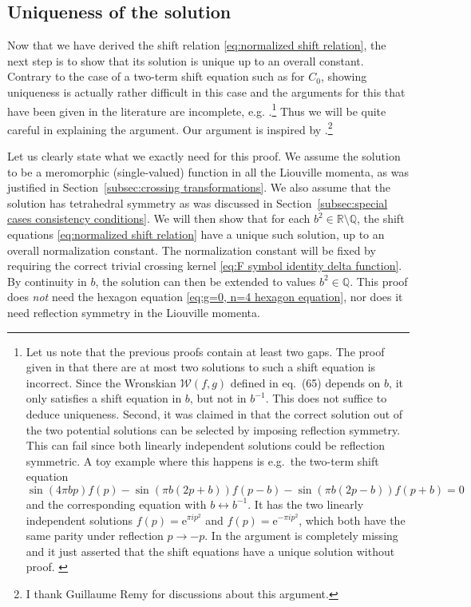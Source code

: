 \documentclass[12pt,a4paper]{article}
\newcommand{\be}{\begin{equation}}
\newcommand{\ee}{\end{equation}}
\newcommand\RR{\mathbb{R}}
\newcommand\QQ{\mathbb{Q}}
\begin{document}
\subsection{Uniqueness of the solution} \label{subsec:uniqueness}
Now that we have derived the shift relation \eqref{eq:normalized shift relation}, the next step is to show that its solution is unique up to an overall constant. Contrary to the case of a two-term shift equation such as for $C_0$, showing uniqueness is actually rather difficult in this case and the arguments for this that have been given in the literature are incomplete, e.g. \cite{Ponsot:1999uf, Ponsot:2001ng,  Teschner:2003en, Remy:2020suk, Roussillon:2020lyc}.\footnote{Let us note that the previous proofs contain at least two gaps. The proof given in \cite[Appendix C]{Ponsot:2001ng} that there are at most two solutions to such a shift equation is incorrect. Since the Wronskian $\mathcal{W}(f,g)$ defined in eq.~(65) depends on $b$, it only satisfies a shift equation in $b$, but not in $b^{-1}$. This does not suffice to deduce uniqueness. Second, it was claimed in \cite{Ponsot:2001ng} that the correct solution out of the two potential solutions can be selected by imposing reflection symmetry. This can fail since both linearly independent solutions could be reflection symmetric. A toy example where this happens is e.g.\ the two-term shift equation
\be 
\sin(4\pi bp) f(p)-\sin(\pi b(2p+b)) f(p-b)-\sin(\pi b(2p-b)) f(p+b)=0
\ee
and the corresponding equation with $b \leftrightarrow b^{-1}$. It has the two linearly independent solutions $f(p)=\mathrm{e}^{\pi i p^2}$ and $f(p)=\mathrm{e}^{-\pi i p^2}$, which both have the same parity under reflection $p \to -p$. In \cite{Roussillon:2020lyc} the argument is completely missing and it just asserted that the shift equations have a unique solution without proof. \label{footnote:error}
}
Thus we will be quite careful in explaining the argument. Our argument is inspired by \cite{Rain:determinants}.\footnote{I thank Guillaume Remy for discussions about this argument.}

Let us clearly state what we exactly need for this proof. We assume the solution to be a meromorphic (single-valued) function in all the Liouville momenta, as was justified in Section~\ref{subsec:crossing transformations}. We also assume that the solution has tetrahedral symmetry as was discussed in Section~\ref{subsec:special cases consistency conditions}.
We will then show that for each $b^2 \in \RR \setminus \QQ$, the shift equations \eqref{eq:normalized shift relation} have a unique such solution, up to an overall normalization constant. The normalization constant will be fixed by requiring the correct trivial crossing kernel \eqref{eq:F symbol identity delta function}. By continuity in $b$, the solution can then be extended to values $b^2 \in \QQ$. This proof does \emph{not} need the hexagon equation \eqref{eq:g=0, n=4 hexagon equation}, nor does it need reflection symmetry in the Liouville momenta.
\end{document}
